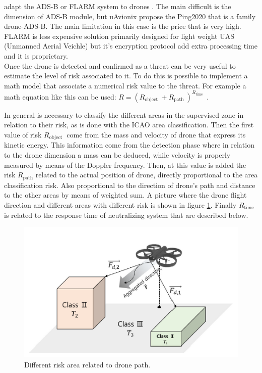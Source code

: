 adapt the ADS-B or FLARM system to drones \cite{survey}. The main difficult is the dimension of ADS-B module, but uAvionix propose the Ping2020 that is a family drone-ADS-B. The main limitation in this case is the price  that is very high. FLARM is less expensive solution primarily designed for light weight UAS (Unmanned Aerial Veichle) but it's encryption protocol add extra processing time and it is proprietary. \\
Once the drone is detected and confirmed as a threat can be very useful to estimate the level of risk associated to it. To do this is possible to implement a math model that associate a numerical risk value to the threat. For example a math equation like this can be used: 
$R=\left(R_{\text {object }}+R_{\text {path }}\right)^{R_{\text {time }}}$
\cite{survey}.

In general is necessary to classify the different areas in the supervised zone in relation to their risk, as is done with the ICAO area classification. Then the first value of risk $R_{\text{object }}$ come from the mass and velocity of drone that express its kinetic energy. This information come from the detection phase where in relation to the drone dimension a mass can be deduced, while velocity is properly measured by means of the Doppler frequency. Then, at this value is added the risk $R_{\text{path}}$ related to the actual position of drone, directly proportional to the area classification risk. Also proportional to the direction of drone's path and distance to the other areas by means of weighted sum. A picture where the drone flight direction and different areas with different risk is shown in figure \ref{risk}. Finally $R_{\text{time }}$ is related to the response time of neutralizing system that are described below.

\begin{figure}[h!]
    \centering
    \includegraphics[width=12cm]{imgs/Risk model.png}
    \caption{Different risk area related to drone path.}
    \label{risk}
\end{figure}

